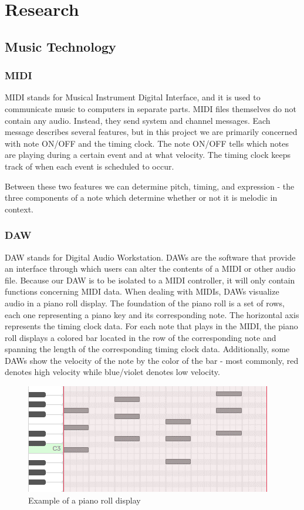 \section{Research}

\subsection{Music Technology}

\subsubsection{MIDI}

MIDI stands for Musical Instrument Digital Interface, and it is used to communicate music
to computers in separate parts. MIDI files themselves do not contain any audio. Instead,
they send system and channel messages. Each message describes several features, but in
this project we are primarily concerned with note ON/OFF and the timing clock. The note
ON/OFF tells which notes are playing during a certain event and at what velocity. The
timing clock keeps track of when each event is scheduled to occur.

Between these two features we can determine pitch, timing, and expression - the three
components of a note which determine whether or not it is melodic in context.

\subsubsection{DAW}
\label{sec:daw}

DAW stands for Digital Audio Workstation. DAWs are the software that provide an interface
through which users can alter the contents of a MIDI or other audio file. Because our DAW
is to be isolated to a MIDI controller, it  will only contain functions concerning MIDI
data. When dealing with MIDIs, DAWs visualize audio in a piano roll display. The
foundation of the piano roll is a set of rows, each one representing a piano key and its
corresponding note. The horizontal axis represents the timing clock data. For each note
that plays in the MIDI, the piano roll displays a colored bar located in the row of the
corresponding note and spanning the length of the corresponding timing clock data.
Additionally, some DAWs show the velocity of the note by the color of the bar - most
commonly, red denotes high velocity while blue/violet denotes low velocity.

\begin{figure}[h!]
  \centering
  \includegraphics{image/PianoRoll.png}
  \caption{Example of a piano roll display}
  \label{fig:piano_roll}
\end{figure}

